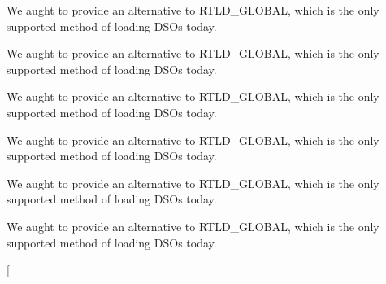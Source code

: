 \begin{DoxyRefList}
\item[\label{bug__bug000010}%
\hypertarget{bug__bug000010}{}%
Global \hyperlink{group__apr__user_ga57b4c6adc3e9d22eeaeb32c8faafcc83}{A\+P\+R\+\_\+\+D\+E\+C\+L\+A\+RE} (apr\+\_\+status\+\_\+t) apr\+\_\+uid\+\_\+current(apr\+\_\+uid\+\_\+t $\ast$userid]We aught to provide an alternative to R\+T\+L\+D\+\_\+\+G\+L\+O\+B\+AL, which is the only supported method of loading D\+S\+Os today.  
\item[\label{bug__bug000010}%
\hypertarget{bug__bug000010}{}%
Global \hyperlink{group__apr__user_ga57b4c6adc3e9d22eeaeb32c8faafcc83}{A\+P\+R\+\_\+\+D\+E\+C\+L\+A\+RE} (apr\+\_\+status\+\_\+t) apr\+\_\+uid\+\_\+current(apr\+\_\+uid\+\_\+t $\ast$userid]We aught to provide an alternative to R\+T\+L\+D\+\_\+\+G\+L\+O\+B\+AL, which is the only supported method of loading D\+S\+Os today.  
\item[\label{bug__bug000010}%
\hypertarget{bug__bug000010}{}%
Global \hyperlink{group__apr__user_ga57b4c6adc3e9d22eeaeb32c8faafcc83}{A\+P\+R\+\_\+\+D\+E\+C\+L\+A\+RE} (apr\+\_\+status\+\_\+t) apr\+\_\+uid\+\_\+current(apr\+\_\+uid\+\_\+t $\ast$userid]We aught to provide an alternative to R\+T\+L\+D\+\_\+\+G\+L\+O\+B\+AL, which is the only supported method of loading D\+S\+Os today.  
\item[\label{bug__bug000010}%
\hypertarget{bug__bug000010}{}%
Global \hyperlink{group__apr__user_ga57b4c6adc3e9d22eeaeb32c8faafcc83}{A\+P\+R\+\_\+\+D\+E\+C\+L\+A\+RE} (apr\+\_\+status\+\_\+t) apr\+\_\+uid\+\_\+current(apr\+\_\+uid\+\_\+t $\ast$userid]We aught to provide an alternative to R\+T\+L\+D\+\_\+\+G\+L\+O\+B\+AL, which is the only supported method of loading D\+S\+Os today.  
\item[\label{bug__bug000010}%
\hypertarget{bug__bug000010}{}%
Global \hyperlink{group__apr__user_ga57b4c6adc3e9d22eeaeb32c8faafcc83}{A\+P\+R\+\_\+\+D\+E\+C\+L\+A\+RE} (apr\+\_\+status\+\_\+t) apr\+\_\+uid\+\_\+current(apr\+\_\+uid\+\_\+t $\ast$userid]We aught to provide an alternative to R\+T\+L\+D\+\_\+\+G\+L\+O\+B\+AL, which is the only supported method of loading D\+S\+Os today.  
\item[\label{bug__bug000010}%
\hypertarget{bug__bug000010}{}%
Global \hyperlink{group__apr__user_ga57b4c6adc3e9d22eeaeb32c8faafcc83}{A\+P\+R\+\_\+\+D\+E\+C\+L\+A\+RE} (apr\+\_\+status\+\_\+t) apr\+\_\+uid\+\_\+current(apr\+\_\+uid\+\_\+t $\ast$userid]We aught to provide an alternative to R\+T\+L\+D\+\_\+\+G\+L\+O\+B\+AL, which is the only supported method of loading D\+S\+Os today.  
\item[\label{bug__bug000010}%

\end{DoxyRefList}
